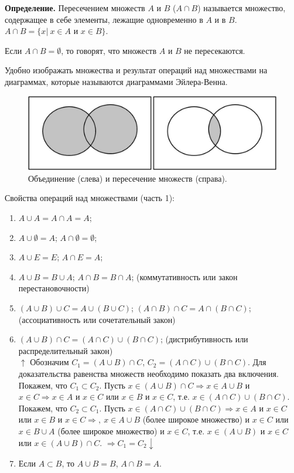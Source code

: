 \documentclass{article}
\begin{document}
    \textbf{Определение.} Пересечением множеств $A$ и $B$ ($A \cap B$) называется множество, содержащее в себе элементы, лежащие одновременно в $A$ и в $B$. $A \cap B = \{x|\ x \in A \textrm{ и } x \in B\}$.
    
    Если $A \cap B = \emptyset$, то говорят, что множеств $A$ и $B$ не пересекаются.  

    Удобно изображать множества и результат операций над множествами на диаграммах, которые называются диаграммами Эйлера-Венна. 

    \begin{figure}[h!]
    \centering
    \includegraphics{1_1}
    \caption{\label{fig:fig1}Объединение (слева) и пересечение множеств (справа).}
    \end{figure}

    Свойства операций над множествами (часть 1):

    \begin{enumerate}
        \item $A \cup A = A \cap A = A$;
        \item $A \cup \emptyset = A$; $A \cap \emptyset = \emptyset$;
        \item $A \cup E = E$; $A \cap E = A$;
        \item $A \cup B = B \cup A$; $A \cap B = B \cap A$; (коммутативность или закон перестановочности)
        \item $(A \cup B) \cup C = A \cup (B \cup C)$; $(A \cap B) \cap C = A \cap (B \cap C)$; (ассоциативность или сочетательный закон)
        \item $(A \cup B) \cap C = (A \cap C) \cup (B \cap C)$; (дистрибутивность или распределительный закон)\\
        $\uparrow$ Обозначим $C_1 = (A \cup B) \cap C$, $C_2 = (A \cap C) \cup (B \cap C)$. Для доказательства равенства множеств необходимо показать два включения.\\
        Покажем, что $C_1 \subset C_2$. Пусть $x \in (A \cup B) \cap C \Rightarrow x \in A \cup B$ и $x \in C \Rightarrow x \in A$ и $x \in C$ или $x \in B$ и $x \in C$, т.е. $x \in (A \cap C) \cup (B \cap C)$.\\
        Покажем, что $C_2 \subset C_1$. Пусть $x \in (A \cap C) \cup (B \cap C) \Rightarrow x \in A$ и $x \in C$ или $x \in B$ и $x \in C \Rightarrow,\ x \in A \cup B$ (более широкое множество) и $x \in C$ или $x \in B \cup A$ (более широкое множество) и $x \in C$, т.е. $x \in (A \cup B)$ и $x \in C$ или $x \in (A \cup B) \cap C$.
        $\Rightarrow C_1 = C_2 \downarrow$
        \item Если $A \subset B$, то $A \cup B = B$, $A \cap B = A$. 
    \end{enumerate}
\end{document}
